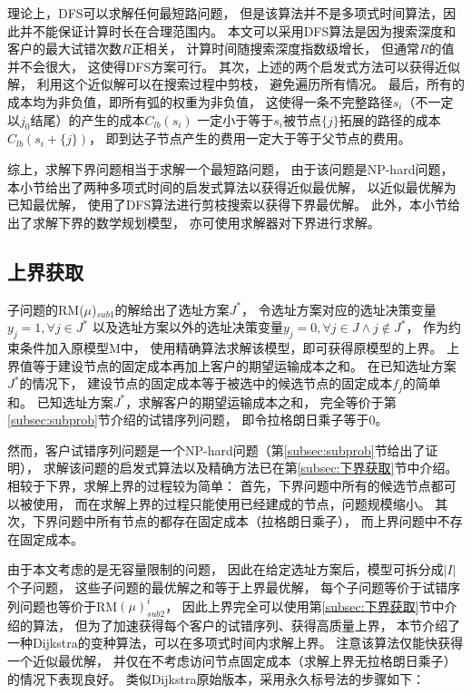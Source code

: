 理论上，DFS可以求解任何最短路问题，
但是该算法并不是多项式时间算法，因此并不能保证计算时长在合理范围内。
本文可以采用DFS算法是因为搜索深度和客户的最大试错次数$R$正相关，
计算时间随搜索深度指数级增长，
但通常$R$的值并不会很大，
这使得DFS方案可行。
其次，上述的两个启发式方法可以获得近似解，
利用这个近似解可以在搜索过程中剪枝，
避免遍历所有情况。
最后，所有的成本均为非负值，即所有弧的权重为非负值，
这使得一条不完整路径$s_i$（不一定以$j_0$结尾）的产生的成本$C_{lb}(s_i)$
一定小于等于$s_i$被节点$\{j\}$拓展的路径的成本$C_{lb}(s_i+\{j\})$，
即到达子节点产生的费用一定大于等于父节点的费用。

综上，求解下界问题相当于求解一个最短路问题，
由于该问题是NP-hard问题，
本小节给出了两种多项式时间的启发式算法以获得近似最优解，
以近似最优解为已知最优解，
使用了DFS算法进行剪枝搜索以获得下界最优解。
此外，本小节给出了求解下界的数学规划模型，
亦可使用求解器对下界进行求解。

\subsection{上界获取}
\label{subsec:上界获取}
子问题的RM($\mu$)$_{sub1}$的解给出了选址方案$J^*$，
令选址方案对应的选址决策变量$y_j=1,\forall j\in J^*$
以及选址方案以外的选址决策变量$y_j=0,\forall j\in J \wedge j\notin J^*$，
作为约束条件加入原模型M中，
使用精确算法求解该模型，即可获得原模型的上界。
上界值等于建设节点的固定成本再加上客户的期望运输成本之和。
在已知选址方案$J^*$的情况下，
建设节点的固定成本等于被选中的候选节点的固定成本$f_j$的简单和。
已知选址方案$J^*$，求解客户的期望运输成本之和，
完全等价于第\ref{subsec:subprob}节介绍的试错序列问题，
即令拉格朗日乘子等于0。

然而，客户试错序列问题是一个NP-hard问题（第\ref{subsec:subprob}节给出了证明），
求解该问题的启发式算法以及精确方法已在第\ref{subsec:下界获取}节中介绍。
相较于下界，求解上界的过程较为简单：
首先，下界问题中所有的候选节点都可以被使用，
而在求解上界的过程只能使用已经建成的节点，问题规模缩小。
其次，下界问题中所有节点的都存在固定成本（拉格朗日乘子），
而上界问题中不存在固定成本。

由于本文考虑的是无容量限制的问题，
因此在给定选址方案后，模型可拆分成$|I|$个子问题，
这些子问题的最优解之和等于上界最优解，
每个子问题等价于试错序列问题也等价于RM$(\mu)_{sub2}^i$，
因此上界完全可以使用第\ref{subsec:下界获取}节中介绍的算法，
但为了加速获得每个客户的试错序列、获得高质量上界，
本节介绍了一种Dijkstra的变种算法，可以在多项式时间内求解上界。
注意该算法仅能快获得一个近似最优解，
并仅在不考虑访问节点固定成本（求解上界无拉格朗日乘子）的情况下表现良好。
类似Dijkstra原始版本，采用永久标号法的步骤如下：


